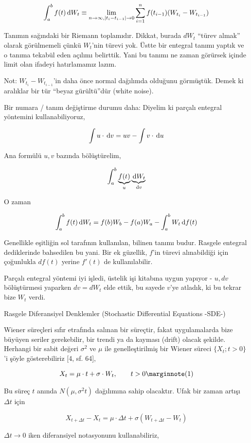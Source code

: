 \documentclass[12pt,fleqn]{article}\usepackage{../../common}
\begin{document}
$$
\int_{ a}^{b} f(t) \,\mathrm{d} W_t \equiv  
\lim_{ n \to \infty, |t_i-t_{i-1}| \to 0 }
\sum_{i=1}^{n} f(t_{i-1}) ( W_{t_i} - W_{t_{i-1}})
$$

Tanımın sağındaki bir Riemann toplamıdır. Dikkat, burada $dW_t$ ``türev almak''
olarak görülmemeli çünkü $W_t$'nin türevi yok. Üstte bir entegral tanımı yaptık
ve o tanıma tekabül eden açılımı belirttik. Yani bu tanımı ne zaman görürsek
içinde limit olan ifadeyi hatırlamamız lazım.

Not: $W_{t_i} - W_{t_{i-1}}$'in daha önce normal dağılımda olduğunu
görmüştük. Demek ki aralıklar bir tür ``beyaz gürültü''dür (white noise).

Bir numara / tanım değiştirme durumu daha: Diyelim ki parçalı entegral yöntemini
kullanabiliyoruz,

$$ \int u \cdot \,\mathrm{d} v = uv - \int v \cdot \,\mathrm{d} u $$

Ana formülü $u,v$ bazında bölüştürelim,

$$ \int_{a}^{b} \underbrace{f(t)}_{u}\underbrace{\,\mathrm{d} W_t}_{\,\mathrm{d} v}$$

O zaman 

$$ \int_{a}^{b} f(t)\,\mathrm{d} W_t = f(b)W_b - f(a)W_a - \int_{a}^{b} W_t \,\mathrm{d} f(t) $$

Genellikle eşitliğin sol tarafının kullanılan, bilinen tanımı budur. Rasgele
entegral dediklerinde bahsedilen bu yani. Bir ek güzellik, $f$'in türevi
alınabildiği için çoğunlukla $df(t)$ yerine $f'(t)$ de kullanılabilir.

Parçalı entegral yöntemi iyi işledi, üstelik işi kitabına uygun yapıyor - $u,dv$
bölüştürmesi yaparken $dv=dW_t$ elde ettik, bu sayede $v$'ye atladık, ki bu
tekrar bize $W_t$ verdi.

Rasgele Diferansiyel Denklemler (Stochastic Differential Equations -SDE-)

Wiener süreçleri sıfır etrafında salınan bir süreçtir, fakat uygulamalarda bize
büyüyen seriler gerekebilir, bir trendi ya da kayması (drift) olacak
şekilde. Herhangi bir sabit değeri $\sigma^2$ ve $\mu$ ile genelleştirilmiş bir
Wiener süreci $\{ X_t; t>0\}$'i şöyle gösterebiliriz [4, sf. 64],

$$ 
X_t = \mu \cdot t + \sigma \cdot W_t, \qquad t>0 
\mlabel{1}
$$

Bu süreç $t$ anında $N(\mu,\sigma^2t)$ dağılımına sahip olacaktır. Ufak bir
zaman artışı $\Delta t$ için

$$ X_{t + \Delta t} - X_t = \mu \cdot \Delta t + \sigma (W_{t+\Delta t}-W_t)$$

$\Delta t \to 0$ iken diferansiyel notasyonunu kullanabiliriz, 
\end{document}
